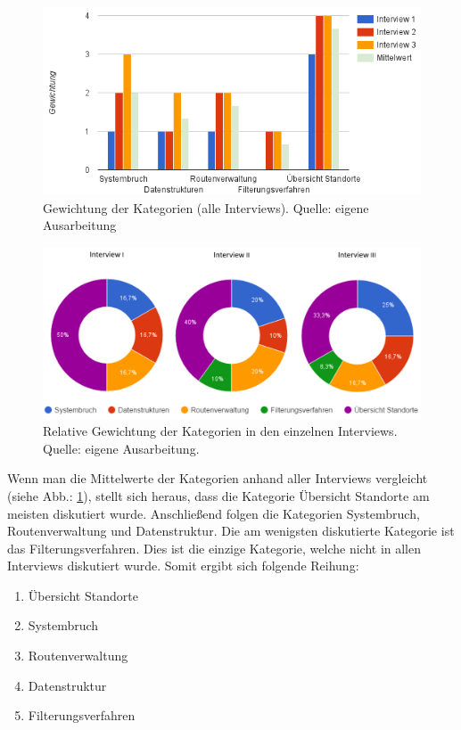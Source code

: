 \documentclass[Bachelorarbeit.tex]{subfiles}
\begin{document}
\begin{figure}[H]
	\centering
	\includegraphics[width=0.9\linewidth]{img/Interviews/KategorienGesamt}
	\caption[Gewichtung der Kategorien (alle Interviews)]{Gewichtung der Kategorien (alle Interviews). Quelle: eigene Ausarbeitung}
	\label{fig:KategorienGesamt}
\end{figure}

\begin{figure}[H]
	\centering
	\includegraphics[width=0.9\linewidth]{img/Interviews/VerteilungNachInterview}
	\caption[Relative Gewichtung der Kategorien in den einzelnen Interviews]{Relative Gewichtung der Kategorien in den einzelnen Interviews. Quelle: eigene Ausarbeitung.}
	\label{fig:GewichtungNachInterview}
\end{figure}

Wenn man die Mittelwerte der Kategorien anhand aller Interviews vergleicht (siehe Abb.: \ref{fig:KategorienGesamt}), stellt sich heraus, dass die Kategorie Übersicht Standorte am meisten diskutiert wurde. 
Anschließend folgen die Kategorien Systembruch, Routenverwaltung und Datenstruktur.
Die am wenigsten diskutierte Kategorie ist das Filterungsverfahren. 
Dies ist die einzige Kategorie, welche nicht in allen Interviews diskutiert wurde.
Somit ergibt sich folgende Reihung:

\begin{enumerate}
	\item Übersicht Standorte
	\item Systembruch
	\item Routenverwaltung
	\item Datenstruktur
	\item Filterungsverfahren
\end{enumerate}
\end{document}
